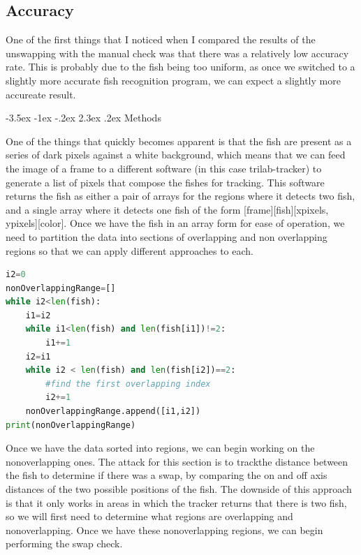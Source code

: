 \documentclass{article}
\makeatletter
\renewcommand\section{\clearpage\newpage\@startsection {section}{1}{\z@}%
	{-3.5ex \@plus -1ex \@minus -.2ex}%
	{2.3ex \@plus.2ex}%
	{\normalfont\Large\bfseries}}
\makeatother
\begin{document}
\subsection{Accuracy}

One of the first things that I noticed when I compared the results of the unswapping with the manual check was that there was a relatively low accuracy rate. This is probably due to the fish being too uniform, as once we switched to a slightly more accurate fish recognition program, we can expect a slightly more accureate result.

\section{Methods}

One of the things that quickly becomes apparent is that the fish are present as a series of dark pixels against a white background, which means that we can feed the image of a frame to a different software (in this case trilab-tracker) to generate a list of pixels that compose the fishes for tracking. This software returns the fish as either a pair of arrays for the regions where it detects two fish, and a single array where it detects one fish of the form [frame][fish][xpixels, ypixels][color]. Once we have the fish in an array form for ease of operation, we need to partition the data into sections of overlapping and non overlapping regions so that we can apply different approaches to each. 

\begin{minipage}[c]{\textwidth}
\begin{lstlisting}[language=Python]
i2=0
nonOverlappingRange=[]
while i2<len(fish):
    i1=i2
    while i1<len(fish) and len(fish[i1])!=2:
        i1+=1
    i2=i1
    while i2 < len(fish) and len(fish[i2])==2:
        #find the first overlapping index
        i2+=1
    nonOverlappingRange.append([i1,i2])
print(nonOverlappingRange)
\end{lstlisting}
\end{minipage}

Once we have the data sorted into regions, we can begin working on the nonoverlapping ones. The attack for this section is to trackthe distance between the fish to determine if there was a swap, by comparing the on and off axis distances of the two possible positions of the fish. The downside of this approach is that it only works in areas in which the tracker returns that there is two fish, so we will first need to determine what regions are overlapping and nonoverlapping. Once we have these nonoverlapping regions, we can begin performing the swap check. 
\end{document}
